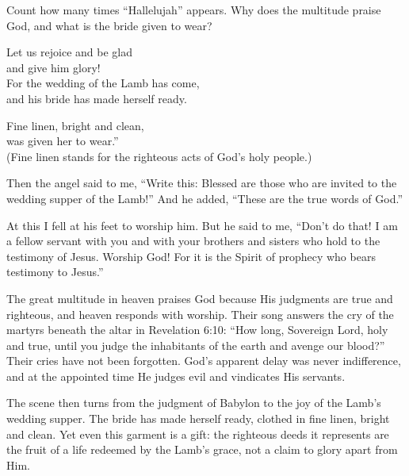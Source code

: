 \begin{ScriptureBox2}{Count how many times ``Hallelujah'' appears. Why does the multitude praise God, and what is the bride given to wear?}
\item[19:7] \hspace*{1em}Let us rejoice and be glad\\
\hspace*{2em}and give him glory!\\
\hspace*{1em}For the wedding of the Lamb has come,\\
\hspace*{2em}and his bride has made herself ready.

\item[19:8] \hspace*{1em}Fine linen, bright and clean,\\
\hspace*{2em}was given her to wear.''\\
(Fine linen stands for the righteous acts of God's holy people.)

\item[19:9] Then the angel said to me, ``Write this: Blessed are those who are invited to the wedding supper of the Lamb!'' And he added, ``These are the true words of God.''

\item[19:10] At this I fell at his feet to worship him. But he said to me, ``Don't do that! I am a fellow servant with you and with your brothers and sisters who hold to the testimony of Jesus. Worship God! For it is the Spirit of prophecy who bears testimony to Jesus.''

\end{ScriptureBox2}

The great multitude in heaven praises God because His judgments are true and righteous, and heaven responds with worship. Their song answers the cry of the martyrs beneath the altar in Revelation 6:10: ``How long, Sovereign Lord, holy and true, until you judge the inhabitants of the earth and avenge our blood?'' Their cries have not been forgotten. God's apparent delay was never indifference, and at the appointed time He judges evil and vindicates His servants.

The scene then turns from the judgment of Babylon to the joy of the Lamb's wedding supper. The bride has made herself ready, clothed in fine linen, bright and clean. Yet even this garment is a gift: the righteous deeds it represents are the fruit of a life redeemed by the Lamb's grace, not a claim to glory apart from Him.

